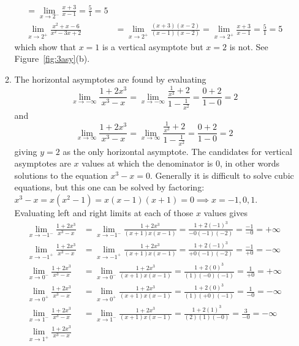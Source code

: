 \documentclass{article}
\begin{document}
\begin{enumerate}
\begin{enumerate}
\begin{align*}
        = \lim_{x\to 2^-} \frac{x+3}{x-1} = \frac{5}{1} = 5 \\
      \lim_{x\to 2^+} \frac{x^2+x-6}{x^2-3x+2}
      &= \lim_{x\to 2^+} \frac{(x+3)(x-2)}{(x-1)(x-2)}
        = \lim_{x\to 2^+} \frac{x+3}{x-1} = \frac{5}{1} = 5
    \end{align*}
    which show that $x=1$ is a vertical asymptote but $x=2$ is not.
    See Figure~\ref{fig:3asy}(b).
  \item %
    The horizontal asymptotes are found by evaluating
    \begin{displaymath}
      \lim_{x\to -\infty} \frac{1+2x^3}{x^3-x}
      = \lim_{x\to -\infty} \frac{\frac{1}{x^3}+2}{1-\frac{1}{x^2}}
      = \frac{0+2}{1-0} = 2
    \end{displaymath}
    and
    \begin{displaymath}
      \lim_{x\to \infty} \frac{1+2x^3}{x^3-x}
      = \lim_{x\to \infty} \frac{\frac{1}{x^3}+2}{1-\frac{1}{x^2}}
      = \frac{0+2}{1-0} = 2
    \end{displaymath}
    giving $y=2$ as the only horizontal asymptote.  The candidates for
    vertical asymptotes are $x$ values at which the denominator is
    $0$, in other words solutions to the equation $x^3-x=0$.
    Generally it is difficult to solve cubic equations, but this one
    can be solved by factoring:
    $x^3-x = x(x^2-1) = x(x-1)(x+1) = 0 \implies x=-1,0,1$.
    Evaluating left and right limits at each of those $x$ values gives
    \begin{align*}
      \lim_{x\to -1^-} \frac{1+2x^3}{x^3-x}
      &= \lim_{x\to -1^-} \frac{1+2x^3}{(x+1)x(x-1)}
        = \frac{1+2(-1)^3}{-0(-1)(-2)} = \frac{-1}{-0} = +\infty \\
      \lim_{x\to -1^+} \frac{1+2x^3}{x^3-x}
      &= \lim_{x\to -1^+} \frac{1+2x^3}{(x+1)x(x-1)}
        = \frac{1+2(-1)^3}{+0(-1)(-2)} = \frac{-1}{+0} = -\infty \\
      \lim_{x\to 0^-} \frac{1+2x^3}{x^3-x}
      &= \lim_{x\to 0^-} \frac{1+2x^3}{(x+1)x(x-1)}
        = \frac{1+2(0)^3}{(1)(-0)(-1)} = \frac{1}{+0} = +\infty \\
      \lim_{x\to 0^+} \frac{1+2x^3}{x^3-x}
      &= \lim_{x\to 0^+} \frac{1+2x^3}{(x+1)x(x-1)}
        = \frac{1+2(0)^3}{(1)(+0)(-1)} = \frac{1}{-0} = -\infty \\
      \lim_{x\to 1^-} \frac{1+2x^3}{x^3-x}
      &= \lim_{x\to 1^-} \frac{1+2x^3}{(x+1)x(x-1)}
        = \frac{1+2(1)^3}{(2)(1)(-0)} = \frac{3}{-0} = -\infty \\
      \lim_{x\to 1^+} \frac{1+2x^3}{x^3-x}

\end{align*}
\end{enumerate}
\end{enumerate}
\end{document}
